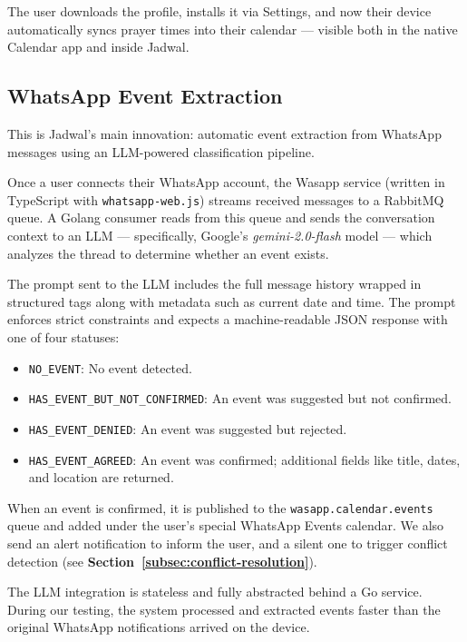 The user downloads the profile, installs it via Settings, and now their device automatically syncs prayer times into their calendar — visible both in the native Calendar app and inside Jadwal.

\subsection{WhatsApp Event Extraction} \label{subsec:whatsapp-event-extraction}

This is Jadwal's main innovation: automatic event extraction from WhatsApp messages using an LLM-powered classification pipeline.

Once a user connects their WhatsApp account, the Wasapp service (written in TypeScript with \texttt{whatsapp-web.js}) streams received messages to a RabbitMQ queue. A Golang consumer reads from this queue and sends the conversation context to an LLM — specifically, Google’s \textit{gemini-2.0-flash} model — which analyzes the thread to determine whether an event exists.

The prompt sent to the LLM includes the full message history wrapped in structured tags along with metadata such as current date and time. The prompt enforces strict constraints and expects a machine-readable JSON response with one of four statuses:

\begin{itemize}
    \item \texttt{NO\_EVENT}: No event detected.
    \item \texttt{HAS\_EVENT\_BUT\_NOT\_CONFIRMED}: An event was suggested but not confirmed.
    \item \texttt{HAS\_EVENT\_DENIED}: An event was suggested but rejected.
    \item \texttt{HAS\_EVENT\_AGREED}: An event was confirmed; additional fields like title, dates, and location are returned.
\end{itemize}

When an event is confirmed, it is published to the \texttt{wasapp.calendar.events} queue and added under the user’s special WhatsApp Events calendar. We also send an alert notification to inform the user, and a silent one to trigger conflict detection (see \textbf{Section~\ref{subsec:conflict-resolution}}).

The LLM integration is stateless and fully abstracted behind a Go service. During our testing, the system processed and extracted events faster than the original WhatsApp notifications arrived on the device.

